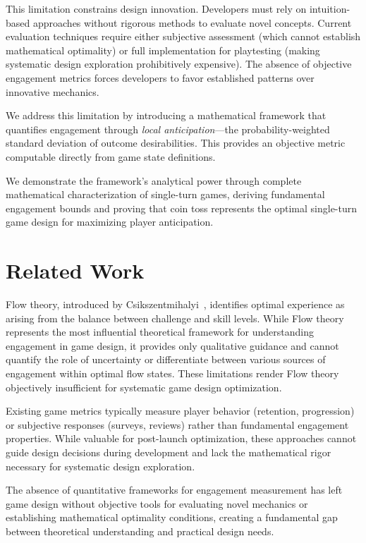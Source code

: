 \documentclass{article}
\begin{document}
This limitation constrains design innovation. Developers must rely on intuition-based approaches without rigorous methods to evaluate novel concepts. Current evaluation techniques require either subjective assessment (which cannot establish mathematical optimality) or full implementation for playtesting (making systematic design exploration prohibitively expensive). The absence of objective engagement metrics forces developers to favor established patterns over innovative mechanics.

We address this limitation by introducing a mathematical framework that quantifies engagement through \emph{local anticipation}—the probability-weighted standard deviation of outcome desirabilities. This provides an objective metric computable directly from game state definitions.

We demonstrate the framework's analytical power through complete mathematical characterization of single-turn games, deriving fundamental engagement bounds and proving that coin toss represents the optimal single-turn game design for maximizing player anticipation.

\section{Related Work}

Flow theory, introduced by Csikszentmihalyi~\cite{csikszentmihalyi1990flow}, identifies optimal experience as arising from the balance between challenge and skill levels. While Flow theory represents the most influential theoretical framework for understanding engagement in game design, it provides only qualitative guidance and cannot quantify the role of uncertainty or differentiate between various sources of engagement within optimal flow states. These limitations render Flow theory objectively insufficient for systematic game design optimization.

Existing game metrics typically measure player behavior (retention, progression) or subjective responses (surveys, reviews) rather than fundamental engagement properties. While valuable for post-launch optimization, these approaches cannot guide design decisions during development and lack the mathematical rigor necessary for systematic design exploration.

The absence of quantitative frameworks for engagement measurement has left game design without objective tools for evaluating novel mechanics or establishing mathematical optimality conditions, creating a fundamental gap between theoretical understanding and practical design needs.
\end{document}
